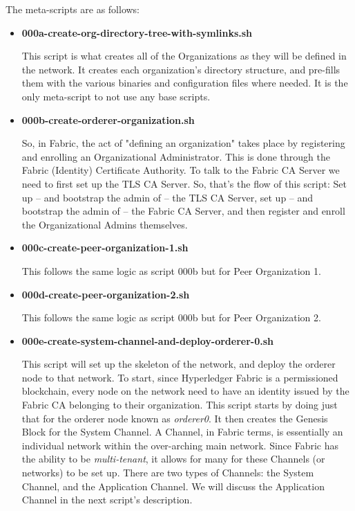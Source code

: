 		The meta-scripts are as follows:
			\begin{itemize}
				\item \textbf{000a-create-org-directory-tree-with-symlinks.sh}
				
					\hspace{10mm}This script is what creates all of the Organizations as they will be defined in the network. It creates each organization's directory structure, and pre-fills them with the various binaries and configuration files where needed. It is the only meta-script to not use any base scripts.
					
				\item \textbf{000b-create-orderer-organization.sh}
				
					\hspace{10mm}So, in Fabric, the act of "defining an organization" takes place by registering and enrolling an Organizational Administrator. This is done through the Fabric (Identity) Certificate Authority. To talk to the Fabric CA Server we need to first set up the TLS CA Server. So, that's the flow of this script: Set up -- and bootstrap the admin of -- the TLS CA Server, set up -- and bootstrap the admin of -- the Fabric CA Server, and then register and enroll the Organizational Admins themselves.
					
				\item \textbf{000c-create-peer-organization-1.sh}
				
					\hspace{10mm}This follows the same logic as script 000b but for Peer Organization 1.
					
				\item \textbf{000d-create-peer-organization-2.sh}
				
					\hspace{10mm}This follows the same logic as script 000b but for Peer Organization 2.
					
				\item \textbf{000e-create-system-channel-and-deploy-orderer-0.sh}
				
					\hspace{10mm}This script will set up the skeleton of the network, and deploy the orderer node to that network. To start, since Hyperledger Fabric is a permissioned blockchain, every node on the network need to have an identity issued by the Fabric CA belonging to their organization. This script starts by doing just that for the orderer node known as \textit{orderer0}. It then creates the Genesis Block for the System Channel. A Channel, in Fabric terms, is essentially an individual network within the over-arching main network. Since Fabric has the ability to be \textit{multi-tenant}, it allows for many for these Channels (or networks) to be set up. There are two types of Channels: the System Channel, and the Application Channel. We will discuss the Application Channel in the next script's description.\\
					

\end{itemize}
